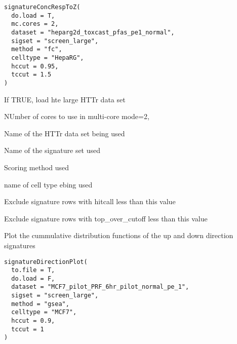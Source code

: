 \documentclass[letterpaper]{book}
\begin{document}
%
\begin{Usage}
\begin{verbatim}
signatureConcRespToZ(
  do.load = T,
  mc.cores = 2,
  dataset = "heparg2d_toxcast_pfas_pe1_normal",
  sigset = "screen_large",
  method = "fc",
  celltype = "HepaRG",
  hccut = 0.95,
  tccut = 1.5
)
\end{verbatim}
\end{Usage}
%
\begin{Arguments}
\begin{ldescription}
\item[\code{do.load}] If TRUE, load hte large HTTr data set

\item[\code{mc.cores}] NUmber of cores to use in multi-core mode=2,

\item[\code{dataset}] Name of the HTTr data set being used

\item[\code{sigset}] Name of the signature set used

\item[\code{method}] Scoring method used

\item[\code{celltype}] name of cell type ebing used

\item[\code{hccut}] Exclude signature rows with hitcall less than this value

\item[\code{tccut}] Exclude signature rows with top\_over\_cutoff less than this value
\end{ldescription}
\end{Arguments}
%
\begin{Description}\relax
Plot the cummulative distribution functions of the up and down direction signatures
\end{Description}
%
\begin{Usage}
\begin{verbatim}
signatureDirectionPlot(
  to.file = T,
  do.load = F,
  dataset = "MCF7_pilot_PRF_6hr_pilot_normal_pe_1",
  sigset = "screen_large",
  method = "gsea",
  celltype = "MCF7",
  hccut = 0.9,
  tccut = 1
)
\end{verbatim}
\end{Usage}
%
\end{document}
